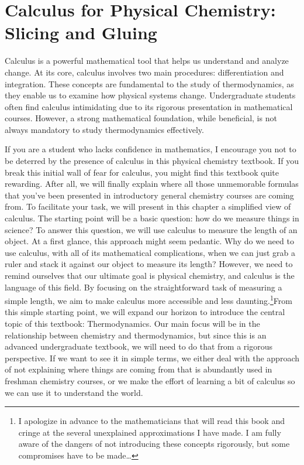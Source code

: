 \documentclass[
  9pt,
]{extbook}
\theoremstyle{definition}
\theoremstyle{definition}
\theoremstyle{definition}
\theoremstyle{remark}
\begin{document}
\hypertarget{calculus-for-physical-chemistry-slicing-and-gluing}{%
\section{Calculus for Physical Chemistry: Slicing and Gluing}\label{calculus-for-physical-chemistry-slicing-and-gluing}}

Calculus is a powerful mathematical tool that helps us understand and analyze change. At its core, calculus involves two main procedures: differentiation and integration. These concepts are fundamental to the study of thermodynamics, as they enable us to examine how physical systems change. Undergraduate students often find calculus intimidating due to its rigorous presentation in mathematical courses. However, a strong mathematical foundation, while beneficial, is not always mandatory to study thermodynamics effectively.

If you are a student who lacks confidence in mathematics, I encourage you not to be deterred by the presence of calculus in this physical chemistry textbook. If you break this initial wall of fear for calculus, you might find this textbook quite rewarding. After all, we will finally explain where all those unmemorable formulas that you've been presented in introductory general chemistry courses are coming from. To facilitate your task, we will present in this chapter a simplified view of calculus. The starting point will be a basic question: how do we measure things in science? To answer this question, we will use calculus to measure the length of an object. At a first glance, this approach might seem pedantic. Why do we need to use calculus, with all of its mathematical complications, when we can just grab a ruler and stack it against our object to measure its length? However, we need to remind ourselves that our ultimate goal is physical chemistry, and calculus is the language of this field. By focusing on the straightforward task of measuring a simple length, we aim to make calculus more accessible and less daunting.\footnote{I apologize in advance to the mathematicians that will read this book and cringe at the several unexplained approximations I have made. I am fully aware of the dangers of not introducing these concepts rigorously, but some compromises have to be made\ldots{}}From this simple starting point, we will expand our horizon to introduce the central topic of this textbook: Thermodynamics. Our main focus will be in the relationship between chemistry and thermodynamics, but since this is an advanced undergraduate textbook, we will need to do that from a rigorous perspective. If we want to see it in simple terms, we either deal with the approach of not explaining where things are coming from that is abundantly used in freshman chemistry courses, or we make the effort of learning a bit of calculus so we can use it to understand the world.
\end{document}
